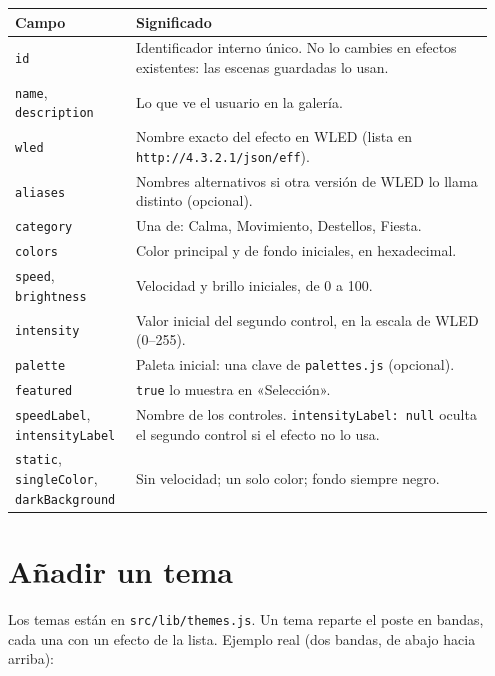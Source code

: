 \begin{longtable}{@{}>{\raggedright\arraybackslash}p{0.24\linewidth} >{\raggedright\arraybackslash}p{0.71\linewidth}@{}}
\toprule
\textbf{Campo} & \textbf{Significado} \\ \midrule \endhead
\texttt{id} & Identificador interno único. No lo cambies en efectos existentes: las escenas guardadas lo usan. \\
\texttt{name}, \texttt{description} & Lo que ve el usuario en la galería. \\
\texttt{wled} & Nombre exacto del efecto en WLED (lista en \texttt{http://4.3.2.1/json/eff}). \\
\texttt{aliases} & Nombres alternativos si otra versión de WLED lo llama distinto (opcional). \\
\texttt{category} & Una de: Calma, Movimiento, Destellos, Fiesta. \\
\texttt{colors} & Color principal y de fondo iniciales, en hexadecimal. \\
\texttt{speed}, \texttt{brightness} & Velocidad y brillo iniciales, de 0 a 100. \\
\texttt{intensity} & Valor inicial del segundo control, en la escala de WLED (0--255). \\
\texttt{palette} & Paleta inicial: una clave de \texttt{palettes.js} (opcional). \\
\texttt{featured} & \texttt{true} lo muestra en «Selección». \\
\texttt{speedLabel}, \texttt{intensityLabel} & Nombre de los controles. \texttt{intensityLabel: null} oculta el segundo control si el efecto no lo usa. \\
\texttt{static}, \texttt{singleColor}, \texttt{darkBackground} & Sin velocidad; un solo color; fondo siempre negro. \\
\bottomrule
\end{longtable}


\section{Añadir un tema}

Los temas están en \texttt{src/lib/themes.js}. Un tema reparte el poste en bandas, cada una con un efecto de la lista. Ejemplo real (dos bandas, de abajo hacia arriba):


